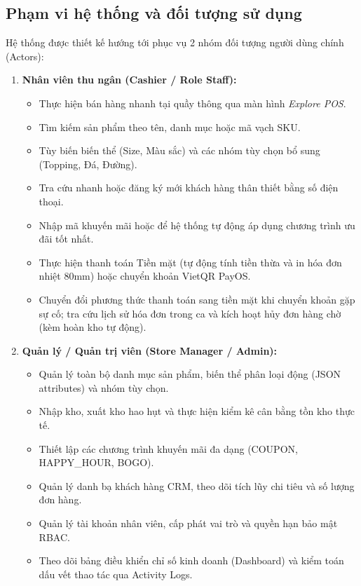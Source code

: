 \subsection{Phạm vi hệ thống và đối tượng sử dụng}
Hệ thống được thiết kế hướng tới phục vụ 2 nhóm đối tượng người dùng chính (Actors):
\begin{enumerate}[label=\arabic*., leftmargin=1.5cm]
    \item \textbf{Nhân viên thu ngân (Cashier / Role Staff):}
    \begin{itemize}
        \item Thực hiện bán hàng nhanh tại quầy thông qua màn hình \textit{Explore POS}.
        \item Tìm kiếm sản phẩm theo tên, danh mục hoặc mã vạch SKU.
        \item Tùy biến biến thể (Size, Màu sắc) và các nhóm tùy chọn bổ sung (Topping, Đá, Đường).
        \item Tra cứu nhanh hoặc đăng ký mới khách hàng thân thiết bằng số điện thoại.
        \item Nhập mã khuyến mãi hoặc để hệ thống tự động áp dụng chương trình ưu đãi tốt nhất.
        \item Thực hiện thanh toán Tiền mặt (tự động tính tiền thừa và in hóa đơn nhiệt 80mm) hoặc chuyển khoản VietQR PayOS.
        \item Chuyển đổi phương thức thanh toán sang tiền mặt khi chuyển khoản gặp sự cố; tra cứu lịch sử hóa đơn trong ca và kích hoạt hủy đơn hàng chờ (kèm hoàn kho tự động).
    \end{itemize}
    \item \textbf{Quản lý / Quản trị viên (Store Manager / Admin):}
    \begin{itemize}
        \item Quản lý toàn bộ danh mục sản phẩm, biến thể phân loại động (JSON attributes) và nhóm tùy chọn.
        \item Nhập kho, xuất kho hao hụt và thực hiện kiểm kê cân bằng tồn kho thực tế.
        \item Thiết lập các chương trình khuyến mãi đa dạng (COUPON, HAPPY\_HOUR, BOGO).
        \item Quản lý danh bạ khách hàng CRM, theo dõi tích lũy chi tiêu và số lượng đơn hàng.
        \item Quản lý tài khoản nhân viên, cấp phát vai trò và quyền hạn bảo mật RBAC.
        \item Theo dõi bảng điều khiển chỉ số kinh doanh (Dashboard) và kiểm toán dấu vết thao tác qua Activity Logs.
    \end{itemize}
\end{enumerate}

